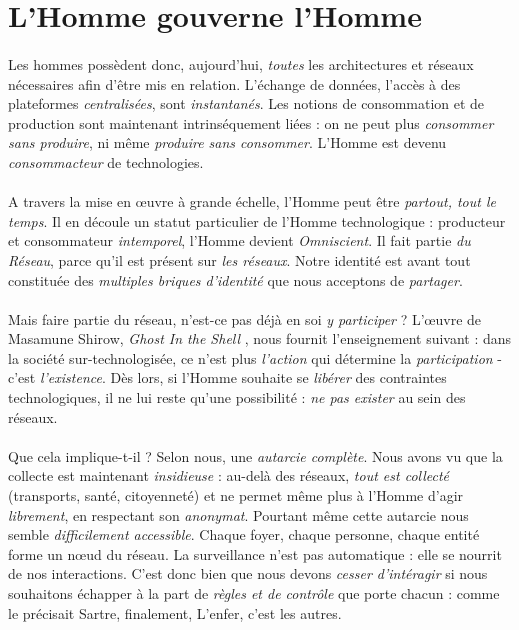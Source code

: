 \section{L'Homme gouverne l'Homme}

\paragraph{} Les hommes possèdent donc, aujourd'hui, \emph{toutes} les architectures et réseaux
nécessaires afin d'être mis en relation. L'échange de données, l'accès à des plateformes
\emph{centralisées}, sont \emph{instantanés}. Les notions de consommation et de production
sont maintenant intrinséquement liées : on ne peut plus \emph{consommer sans produire}, ni même
\emph{produire sans consommer}. L'Homme est devenu \emph{consommacteur} de technologies.

\paragraph{} A travers la mise en \oe{}uvre à grande échelle, l'Homme peut être
\emph{partout, tout le temps}. Il en découle un statut particulier de l'Homme 
technologique : producteur et consommateur \emph{intemporel}, l'Homme devient \emph{Omniscient}.
Il fait partie \emph{du Réseau}, parce qu'il est présent sur \emph{les réseaux}. Notre identité
est avant tout constituée des \emph{multiples briques d'identité} que nous acceptons de
\emph{partager}.

\paragraph{} Mais faire partie du réseau, n'est-ce pas déjà en soi \emph{y participer} ? L'\oe{}uvre
de Masamune Shirow, \emph{Ghost In the Shell} \cite{GhostInTheShell}, nous fournit l'enseignement
suivant : dans la société sur-technologisée, ce n'est plus \emph{l'action} qui détermine la
\emph{participation} - c'est \emph{l'existence}. Dès lors, si l'Homme souhaite se \emph{libérer}
des contraintes technologiques, il ne lui reste qu'une possibilité : \emph{ne pas exister} au
sein des réseaux.

\paragraph{} Que cela implique-t-il ? Selon nous, une \emph{autarcie complète}. Nous avons vu que la
collecte est maintenant \emph{insidieuse} : au-delà des réseaux, \emph{tout est collecté} (transports,
santé, citoyenneté) et ne permet même plus à l'Homme d'agir \emph{librement}, en respectant son
\emph{anonymat}. Pourtant même cette autarcie nous semble \emph{difficilement accessible}. Chaque foyer,
chaque personne, chaque entité forme un n\oe{}ud du réseau. La surveillance n'est pas automatique : 
elle se nourrit de nos interactions. C'est donc bien que nous devons \emph{cesser d'intéragir} si nous
souhaitons échapper à la part de \emph{règles et de contrôle} que porte chacun : comme le précisait Sartre,
finalement, \guillemotleft L'enfer, c'est les autres\guillemotright. \cite{Sartre0}

